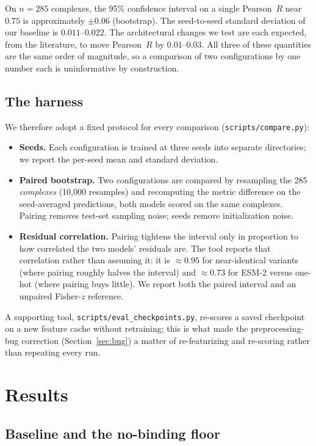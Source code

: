 \documentclass[11pt]{article}
\newcommand{\code}[1]{\texttt{#1}}
\newcommand{\pearson}{Pearson~$R$}
\begin{document}
On $n=285$ complexes, the 95\% confidence interval on a single \pearson{} near $0.75$ is
approximately $\pm0.06$ (bootstrap). The seed-to-seed standard deviation of our baseline is
$0.011$--$0.022$. The architectural changes we test are each expected, from the literature,
to move \pearson{} by $0.01$--$0.03$. All three of these quantities are the same order of
magnitude, so a comparison of two configurations by one number each is uninformative by
construction.

\subsection{The harness}

We therefore adopt a fixed protocol for every comparison (\code{scripts/compare.py}):

\begin{itemize}
\item \textbf{Seeds.} Each configuration is trained at three seeds into separate
directories; we report the per-seed mean and standard deviation.
\item \textbf{Paired bootstrap.} Two configurations are compared by resampling the 285
\emph{complexes} (10{,}000 resamples) and recomputing the metric difference on the
seed-averaged predictions, both models scored on the same complexes. Pairing removes
test-set sampling noise; seeds remove initialization noise.
\item \textbf{Residual correlation.} Pairing tightens the interval only in proportion to how
correlated the two models' residuals are. The tool reports that correlation rather than
assuming it: it is $\approx0.95$ for near-identical variants (where pairing roughly halves
the interval) and $\approx0.73$ for ESM-2 versus one-hot (where pairing buys little). We
report both the paired interval and an unpaired Fisher-$z$ reference.
\end{itemize}

A supporting tool, \code{scripts/eval\_checkpoints.py}, re-scores a saved checkpoint on a
new feature cache without retraining; this is what made the preprocessing-bug correction
(Section~\ref{sec:bug}) a matter of re-featurizing and re-scoring rather than repeating
every run.

\section{Results}

\subsection{Baseline and the no-binding floor}
\label{sec:baseline}
\end{document}
